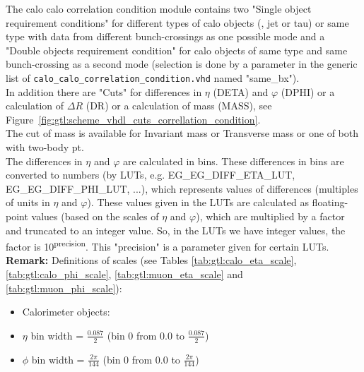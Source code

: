 The calo calo correlation condition module contains two "Single object requirement conditions" for different types of calo objects (\egamma, jet or tau) or same type with data from different
bunch-crossings as one possible mode and a "Double objects requirement condition" for calo objects of same type and same bunch-crossing as a second mode (selection is done by a parameter in the
generic list of \texttt{calo\_calo\_correlation\_condition.vhd} named "same\_bx").\\
In addition there are "Cuts" for differences in $\eta$ (DETA) and $\varphi$ (DPHI) or a calculation of $\Delta$$R$ (DR) or a calculation of mass (MASS), see Figure~\ref{fig:gtl:scheme_vhdl_cuts_correllation_condition}.\\
The cut of mass is available for Invariant mass or Transverse mass or one of both with two-body pt.\\
The differences in $\eta$ and $\varphi$ are calculated in bins. These differences in bins are converted to numbers (by LUTs, e.g. \small{EG\_EG\_DIFF\_ETA\_LUT, EG\_EG\_DIFF\_PHI\_LUT}\normalsize, ...),
which represents values of differences (multiples of units in $\eta$ and $\varphi$).
These values given in the LUTs are calculated as floating-point values (based on the scales of $\eta$ and $\varphi$), which are multiplied by a factor and truncated to an integer value.
So, in the LUTs we have integer values, the factor is 10\textsuperscript{\tiny{precision}\normalsize}. This "precision" is a parameter given for certain LUTs.\\

\textbf{Remark:} Definitions of scales (see Tables \ref{tab:gtl:calo_eta_scale}, \ref{tab:gtl:calo_phi_scale}, \ref{tab:gtl:muon_eta_scale} and \ref{tab:gtl:muon_phi_scale}):
\begin{itemize}
\item Calorimeter objects:
\item $\eta$ bin width = $\frac{0.087}{2}$ (bin 0 from 0.0 to $\frac{0.087}{2}$)
\item $\phi$ bin width = $\frac{2\pi}{144}$ (bin 0 from 0.0 to $\frac{2\pi}{144}$)
\end{itemize}

